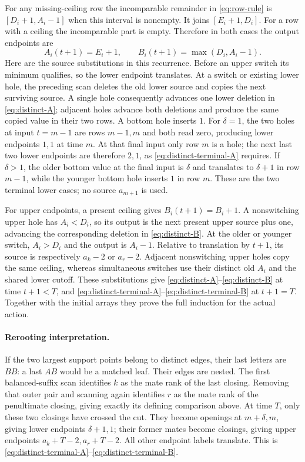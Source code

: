 For any missing-ceiling row the incomparable remainder in \eqref{eq:row-rule} is $[D_i+1,A_i-1]$ when this interval is nonempty. It joins $[E_i+1,D_i]$. For a row with a ceiling the incomparable part is empty. Therefore in both cases the output endpoints are
\begin{equation}\label{eq:distinct-recurrence}
 A_i(t+1)=E_i+1,\qquad
 B_i(t+1)=\max(D_i,A_i-1).
\end{equation}
Here are the source substitutions in this recurrence. Before an upper switch its minimum qualifies, so the lower endpoint translates. At a switch or existing lower hole, the preceding scan deletes the old lower source and copies the next surviving source. A single hole consequently advances one lower deletion in \eqref{eq:distinct-A}; adjacent holes advance both deletions and produce the same copied value in their two rows. A bottom hole inserts $1$. For $\delta=1$, the two holes at input $t=m-1$ are rows $m-1,m$ and both read zero, producing lower endpoints $1,1$ at time $m$. At that final input only row $m$ is a hole; the next last two lower endpoints are therefore $2,1$, as \eqref{eq:distinct-terminal-A} requires. If $\delta>1$, the older bottom value at the final input is $\delta$ and translates to $\delta+1$ in row $m-1$, while the younger bottom hole inserts $1$ in row $m$. These are the two terminal lower cases; no source $a_{m+1}$ is used.

For upper endpoints, a present ceiling gives $B_i(t+1)=B_i+1$. A nonswitching upper hole has $A_i<D_i$, so its output is the next present upper source plus one, advancing the corresponding deletion in \eqref{eq:distinct-B}. At the older or younger switch, $A_i>D_i$ and the output is $A_i-1$. Relative to translation by $t+1$, its source is respectively $a_k-2$ or $a_r-2$. Adjacent nonswitching upper holes copy the same ceiling, whereas simultaneous switches use their distinct old $A_i$ and the shared lower cutoff. These substitutions give \eqref{eq:distinct-A}--\eqref{eq:distinct-B} at time $t+1<T$, and \eqref{eq:distinct-terminal-A}--\eqref{eq:distinct-terminal-B} at $t+1=T$. Together with the initial arrays they prove the full induction for the actual action.

\paragraph{Rerooting interpretation.}
If the two largest support points belong to distinct edges, their last letters are $BB$: a last $AB$ would be a matched leaf. Their edges are nested. The first balanced-suffix scan identifies $k$ as the mate rank of the last closing. Removing that outer pair and scanning again identifies $r$ as the mate rank of the penultimate closing, giving exactly its defining comparison above. At time $T$, only these two closings have crossed the cut. They become openings at $m+\delta,m$, giving lower endpoints $\delta+1,1$; their former mates become closings, giving upper endpoints $a_k+T-2,a_r+T-2$. All other endpoint labels translate. This is \eqref{eq:distinct-terminal-A}--\eqref{eq:distinct-terminal-B}.

